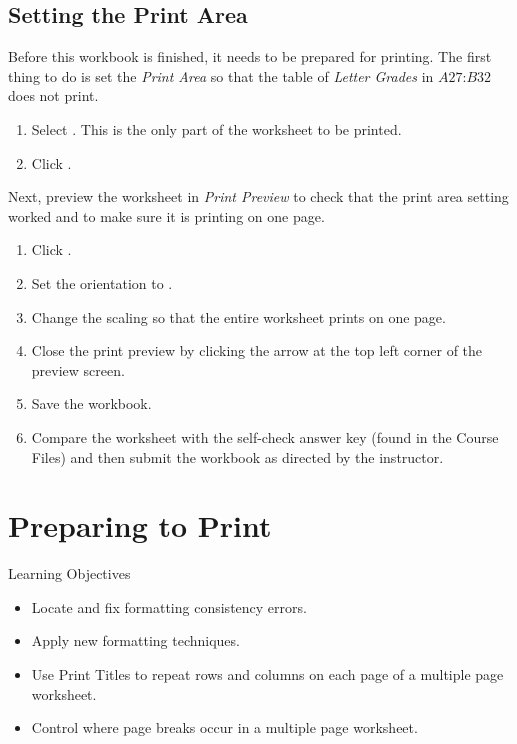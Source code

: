 \subsection{Setting the Print Area}

Before this workbook is finished, it needs to be prepared for printing. The first thing to do is set the \textit{Print Area} so that the table of \textit{Letter Grades} in $ A27 $:$ B32 $ does not print.

\begin{enumerate}
	\item Select . This is the only part of the worksheet to be printed.
	\item Click .
\end{enumerate}

Next, preview the worksheet in \textit{Print Preview} to check that the print area setting worked and to make sure it is printing on one page.

\begin{enumerate}
	\item Click .
	\item Set the orientation to .
	\item Change the scaling so that the entire worksheet prints on one page.
	\item Close the print preview by clicking the arrow at the top left corner of the preview screen.
	\item Save the  workbook.
	\item Compare the worksheet with the self-check answer key (found in the Course Files) and then submit the  workbook as directed by the instructor.
\end{enumerate}

\section{Preparing to Print}

\begin{center}
	\begin{objbox}{Learning Objectives}
		\begin{itemize}
			\setlength{\itemsep}{0pt}
			\setlength{\parskip}{0pt}
			\setlength{\parsep}{0pt}

			\item Locate and fix formatting consistency errors.
			\item Apply new formatting techniques.
			\item Use Print Titles to repeat rows and columns on each page of a multiple page worksheet.
			\item Control where page breaks occur in a multiple page worksheet.
			
		\end{itemize}
	\end{objbox}
\end{center}

